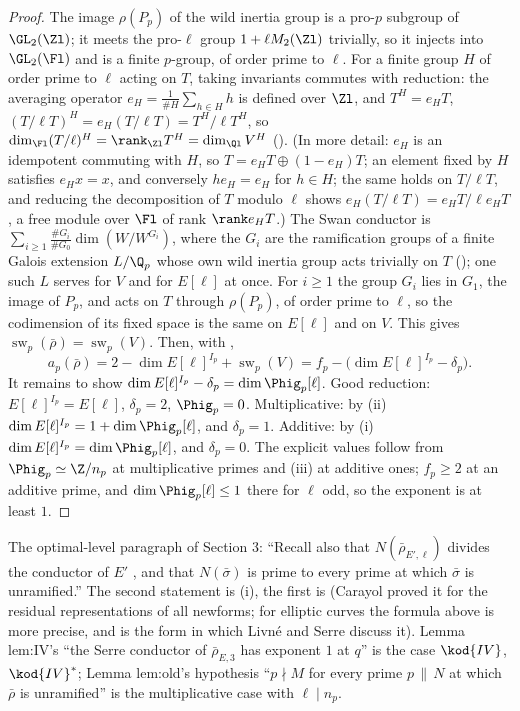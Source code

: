 \begin{proof}
The image $\rho(P_p)$ of the wild inertia group is a pro-$p$ subgroup of $\GL_2(\Zl)$; it meets the pro-$\ell$ group $1+\ell M_2(\Zl)$ trivially, so it injects
into $\GL_2(\Fl)$ and is a finite $p$-group, of order prime to $\ell$. For a finite group $H$ of order prime to $\ell$ acting on $T$, taking invariants
commutes with reduction: the averaging operator $e_H=\frac1{\#H}\sum_{h\in H}h$ is defined over $\Zl$, and $T^H=e_HT$, $(T/\ell T)^H=e_H(T/\ell T)=T^H/\ell T^H$, so
$\dim_{\Fl}(T/\ell)^H=\rank_{\Zl}T^H=\dim_{\Ql}V^H$ (). (In more detail: $e_H$ is an idempotent commuting with $H$, so $T=e_HT\oplus(1-e_H)T$; an element fixed
by $H$ satisfies $e_Hx=x$, and conversely $he_H=e_H$ for $h\in H$; the same holds on $T/\ell T$, and reducing the decomposition of $T$ modulo $\ell$ shows
$e_H(T/\ell T)=e_HT/\ell e_HT$, a free module over $\Fl$ of rank $\rank e_HT$.) The Swan conductor is $\sum_{i\ge1}\frac{\#G_i}{\#G_0}\dim(W/W^{G_i})$, where the $G_i$ are the ramification groups of a
finite Galois extension $L/\Q_p$ whose own wild inertia group acts trivially on $T$ (); one such $L$ serves for $V$ and for $E[\ell]$ at once. For
$i\ge1$ the group $G_i$ lies in $G_1$, the image of $P_p$, and acts on $T$ through $\rho(P_p)$, of order prime to $\ell$, so the codimension of its fixed space is the same on
$E[\ell]$ and on $V$. This gives
$\operatorname{sw}_p(\bar\rho)=\operatorname{sw}_p(V)$. Then, with ,
\[
a_p(\bar\rho)=2-\dim E[\ell]^{I_p}+\operatorname{sw}_p(V)=f_p-\bigl(\dim E[\ell]^{I_p}-\delta_p\bigr).
\]
It remains to show $\dim E[\ell]^{I_p}-\delta_p=\dim\Phig_p[\ell]$. Good reduction: $E[\ell]^{I_p}=E[\ell]$, $\delta_p=2$, $\Phig_p=0$. Multiplicative: by
(ii) $\dim E[\ell]^{I_p}=1+\dim\Phig_p[\ell]$, and $\delta_p=1$. Additive: by (i)
$\dim E[\ell]^{I_p}=\dim\Phig_p[\ell]$, and $\delta_p=0$. The explicit values follow from $\Phig_p\simeq\Z/n_p$ at multiplicative primes and
(iii) at additive ones; $f_p\ge2$ at an additive prime, and $\dim\Phig_p[\ell]\le1$ there for $\ell$ odd, so the exponent is
at least $1$.
\end{proof}

\begin{paperlink}
The optimal-level paragraph of Section 3: ``Recall also that $N(\bar\rho_{E',\ell})$ divides the conductor of $E'$ \cite{Carayol89}, and that
$N(\bar\sigma)$ is prime to every prime at which $\bar\sigma$ is unramified.'' The second statement is
(i), the first is  (Carayol proved it for the residual representations
of all newforms; for elliptic curves the formula above is more precise, and is the form in which Livn\'e \cite{Livne89} and Serre
\cite[Section 4]{Serre87} discuss it). Lemma lem:IV's ``the Serre conductor of $\bar\rho_{E,3}$ has exponent $1$ at $q$'' is the case $\kod{IV}$, $\kod{IV}^*$; Lemma
lem:old's hypothesis ``$p\nmid M$ for every prime $p\,\|\,N$ at which $\bar\rho$ is unramified'' is the multiplicative case with $\ell\mid n_p$.
\end{paperlink}

